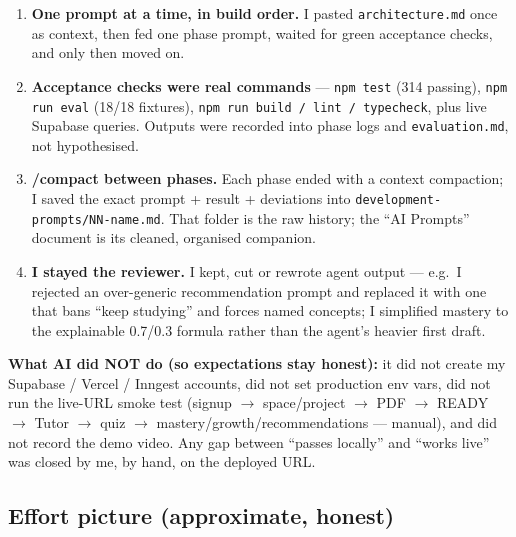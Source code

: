 \documentclass[11pt,a4paper]{article}
\begin{document}
\begin{enumerate}
\item \textbf{One prompt at a time, in build order.} I pasted
\texttt{architecture.md} once as context, then fed one phase prompt, waited for green
acceptance checks, and only then moved on.
\item \textbf{Acceptance checks were real commands} --- \texttt{npm test} (314 passing),
\texttt{npm run eval} (18/18 fixtures), \texttt{npm run build / lint / typecheck},
plus live Supabase queries. Outputs were recorded into phase logs and
\texttt{evaluation.md}, not hypothesised.
\item \textbf{/compact between phases.} Each phase ended with a context compaction; I saved
the exact prompt + result + deviations into \texttt{development-prompts/NN-name.md}.
That folder is the raw history; the ``AI Prompts'' document is its cleaned, organised companion.
\item \textbf{I stayed the reviewer.} I kept, cut or rewrote agent output --- e.g.\ I rejected
an over-generic recommendation prompt and replaced it with one that bans ``keep studying''
and forces named concepts; I simplified mastery to the explainable 0.7/0.3 formula rather
than the agent's heavier first draft.
\end{enumerate}

\begin{shaded}
\noindent\textbf{What AI did NOT do (so expectations stay honest):}
it did not create my Supabase / Vercel / Inngest accounts, did not set production env vars,
did not run the live-URL smoke test (signup $\rightarrow$ space/project $\rightarrow$ PDF
$\rightarrow$ READY $\rightarrow$ Tutor $\rightarrow$ quiz $\rightarrow$ mastery/growth/recommendations
--- manual), and did not record the demo video.
Any gap between ``passes locally'' and ``works live'' was closed by me, by hand, on the deployed URL.
\end{shaded}

\subsection{Effort picture (approximate, honest)}
\end{document}
